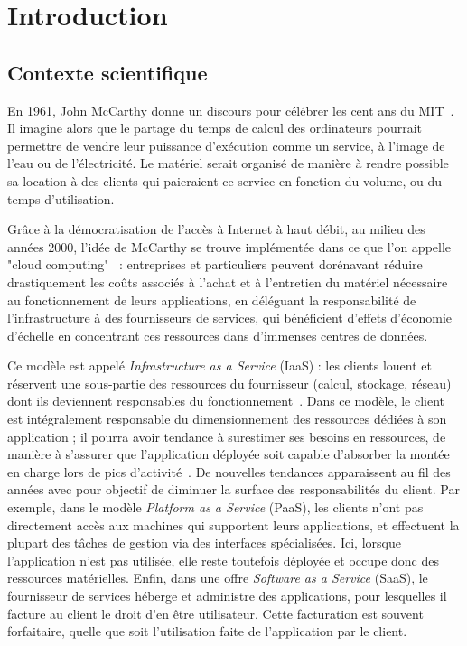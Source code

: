 \chapter{Introduction}
\label{chapter:introduction}

\section{Contexte scientifique}

En 1961, John McCarthy donne un discours pour célébrer les cent ans du MIT~\cite{greenberger1962management}. Il imagine alors que le partage du temps de calcul des ordinateurs pourrait permettre de vendre leur puissance d'exécution comme un service, à l'image de l'eau ou de l'électricité. Le matériel serait organisé de manière à rendre possible sa location à des clients qui paieraient ce service en fonction du volume, ou du temps d'utilisation.

Grâce à la démocratisation de l'accès à Internet à haut débit, au milieu des années 2000, l'idée de McCarthy se trouve implémentée dans ce que l'on appelle "cloud computing"~\cite{hayesCloudComputing2008} : entreprises et particuliers peuvent dorénavant réduire drastiquement les coûts associés à l'achat et à l'entretien du matériel nécessaire au fonctionnement de leurs applications, en déléguant la responsabilité de l'infrastructure à des fournisseurs de services, qui bénéficient d'effets d'économie d'échelle en concentrant ces ressources dans d'immenses centres de données.

Ce modèle est appelé \textit{Infrastructure as a Service} (IaaS) : les clients louent et réservent une sous-partie des ressources du fournisseur (calcul, stockage, réseau) dont ils deviennent responsables du fonctionnement~\cite{mellNISTDefinitionCloud}. Dans ce modèle, le client est intégralement responsable du dimensionnement des ressources dédiées à son application ; il pourra avoir tendance à surestimer ses besoins en ressources, de manière à s'assurer que l'application déployée soit capable d'absorber la montée en charge lors de pics d'activité~\cite{takMoveNotMove}. De nouvelles tendances apparaissent au fil des années avec pour objectif de diminuer la surface des responsabilités du client. Par exemple, dans le modèle \textit{Platform as a Service} (PaaS), les clients n'ont pas directement accès aux machines qui supportent leurs applications, et effectuent la plupart des tâches de gestion via des interfaces spécialisées. Ici, lorsque l'application n'est pas utilisée, elle reste toutefois déployée et occupe donc des ressources matérielles. Enfin, dans une offre \textit{Software as a Service} (SaaS), le fournisseur de services héberge et administre des applications, pour lesquelles il facture au client le droit d'en être utilisateur. Cette facturation est souvent forfaitaire, quelle que soit l'utilisation faite de l'application par le client.


